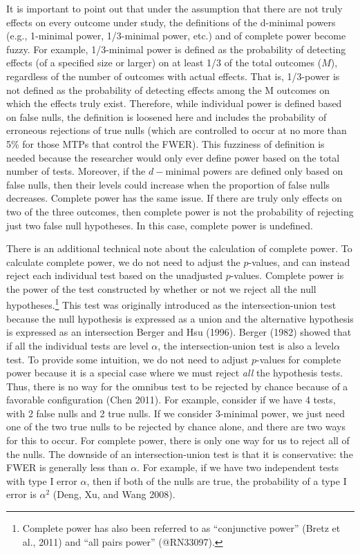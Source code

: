 \documentclass[
]{article}
\begin{document}
It is important to point out that under the assumption that there are
not truly effects on every outcome under study, the definitions of the
d-minimal powers (e.g., 1-minimal power, 1/3-minimal power, etc.) and of
complete power become fuzzy. For example, 1/3-minimal power is defined
as the probability of detecting effects (of a specified size or larger)
on at least 1/3 of the total outcomes (\(M\)), regardless of the number
of outcomes with actual effects. That is, 1/3-power is not defined as
the probability of detecting effects among the M outcomes on which the
effects truly exist. Therefore, while individual power is defined based
on false nulls, the definition is loosened here and includes the
probability of erroneous rejections of true nulls (which are controlled
to occur at no more than 5\% for those MTPs that control the FWER). This
fuzziness of definition is needed because the researcher would only ever
define power based on the total number of tests. Moreover, if the
\(d-\)minimal powers are defined only based on false nulls, then their
levels could increase when the proportion of false nulls decreases.
Complete power has the same issue. If there are truly only effects on
two of the three outcomes, then complete power is not the probability of
rejecting just two false null hypotheses. In this case, complete power
is undefined.

There is an additional technical note about the calculation of complete
power. To calculate complete power, we do not need to adjust the
\(p\)-values, and can instead reject each individual test based on the
unadjusted \(p\)-values. Complete power is the power of the test
constructed by whether or not we reject all the null
hypotheses.\footnote{Complete power has also been referred to as “conjunctive power” (Bretz et al., 2011) and “all pairs power” (@RN33097).}
This test was originally introduced as the intersection-union test
because the null hypothesis is expressed as a union and the alternative
hypothesis is expressed as an intersection Berger and Hsu (1996). Berger
(1982) showed that if all the individual tests are level \(\alpha\), the
intersection-union test is also a level\(\alpha\) test. To provide some
intuition, we do not need to adjust \(p\)-values for complete power
because it is a special case where we must reject \emph{all} the
hypothesis tests. Thus, there is no way for the omnibus test to be
rejected by chance because of a favorable configuration (Chen 2011). For
example, consider if we have 4 tests, with 2 false nulls and 2 true
nulls. If we consider \(3\)-minimal power, we just need one of the two
true nulls to be rejected by chance alone, and there are two ways for
this to occur. For complete power, there is only one way for us to
reject all of the nulls. The downside of an intersection-union test is
that it is conservative: the FWER is generally less than \(\alpha\). For
example, if we have two independent tests with type I error \(\alpha\),
then if both of the nulls are true, the probability of a type I error is
\(\alpha^2\) (Deng, Xu, and Wang 2008).
\end{document}
